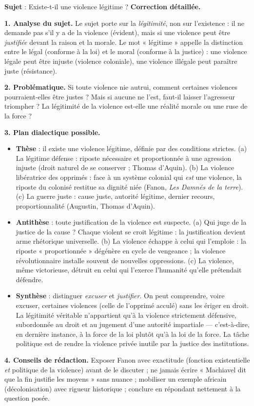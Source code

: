 \documentclass[11pt]{article}
\begin{document}
\begin{exoresolu}
\textbf{Sujet} : Existe-t-il une violence légitime ?
\tcblower
\textbf{Correction détaillée.}

\textbf{1. Analyse du sujet.} Le sujet porte sur la \emph{légitimité}, non sur l'existence : il ne demande pas s'il y a de la violence (évident), mais si une violence peut être \emph{justifiée} devant la raison et la morale. Le mot « légitime » appelle la distinction entre le légal (conforme à la loi) et le moral (conforme à la justice) : une violence légale peut être injuste (violence coloniale), une violence illégale peut paraître juste (résistance).

\textbf{2. Problématique.} Si toute violence nie autrui, comment certaines violences pourraient-elles être justes ? Mais si aucune ne l'est, faut-il laisser l'agresseur triompher ? La légitimité de la violence est-elle une réalité morale ou une ruse de la force ?

\textbf{3. Plan dialectique possible.}
\begin{itemize}
\item \textbf{Thèse} : il existe une violence légitime, définie par des conditions strictes. (a) La légitime défense : riposte nécessaire et proportionnée à une agression injuste (droit naturel de se conserver ; Thomas d'Aquin). (b) La violence libératrice des opprimés : face à un système colonial qui \emph{est} une violence, la riposte du colonisé restitue sa dignité niée (Fanon, \emph{Les Damnés de la terre}). (c) La guerre juste : cause juste, autorité légitime, dernier recours, proportionnalité (Augustin, Thomas d'Aquin).
\item \textbf{Antithèse} : toute justification de la violence est suspecte. (a) Qui juge de la justice de la cause ? Chaque violent se croit légitime : la justification devient arme rhétorique universelle. (b) La violence échappe à celui qui l'emploie : la riposte « proportionnée » dégénère en cycle de vengeance ; la violence révolutionnaire installe souvent de nouvelles oppressions. (c) La violence, même victorieuse, détruit en celui qui l'exerce l'humanité qu'elle prétendait défendre.
\item \textbf{Synthèse} : distinguer \emph{excuser} et \emph{justifier}. On peut comprendre, voire excuser, certaines violences (celle de l'opprimé acculé) sans les ériger en droit. La légitimité véritable n'appartient qu'à la violence strictement défensive, subordonnée au droit et au jugement d'une autorité impartiale — c'est-à-dire, en dernière instance, à la force de la loi plutôt qu'à la loi de la force. La tâche politique est de rendre la violence privée inutile par la justice des institutions.
\end{itemize}

\textbf{4. Conseils de rédaction.} Exposer Fanon avec exactitude (fonction existentielle \emph{et} politique de la violence) avant de le discuter ; ne jamais écrire « Machiavel dit que la fin justifie les moyens » sans nuance ; mobiliser un exemple africain (décolonisation) avec rigueur historique ; conclure en répondant nettement à la question posée.
\end{exoresolu}
\end{document}
